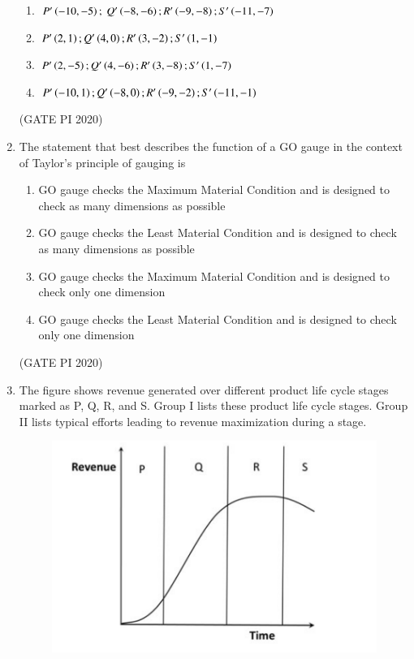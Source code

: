 \documentclass[journal,12pt,onecolumn]{IEEEtran}
\theoremstyle{remark}
\begin{document}
\begin{enumerate}
\begin{enumerate}
  \item $P'\left(-10,-5\right);\ Q'\left(-8,-6\right); R'\left(-9,-8\right); S'\left(-11,-7\right)$
    \item $P'\left(2,1\right); Q'\left(4,0\right); R'\left(3,-2\right); S'\left(1,-1\right)$
    \item $P'\left(2,-5\right); Q'\left(4,-6\right); R'\left(3,-8\right); S'\left(1,-7\right)$
    \item $P'\left(-10,1\right); Q'\left(-8,0\right); R'\left(-9,-2\right); S'\left(-11,-1\right)$
\end{enumerate}

\hfill (GATE PI 2020)

\item The statement that best describes the function of a GO gauge in the context of Taylor's principle of gauging is
\begin{enumerate}
    \item GO gauge checks the Maximum Material Condition and is designed to check as many dimensions as possible
    \item GO gauge checks the Least Material Condition and is designed to check as many dimensions as possible
    \item GO gauge checks the Maximum Material Condition and is designed to check only one dimension
    \item GO gauge checks the Least Material Condition and is designed to check only one dimension
\end{enumerate}

\hfill (GATE PI 2020)

\item The figure shows revenue generated over different product life cycle stages marked as P, Q, R, and S. Group I lists these product life cycle stages. Group II lists typical efforts leading to revenue maximization during a stage.

\begin{figure}[H]
    \centering
    \includegraphics[width=0.5\columnwidth]{figs/fig13.png}
    \caption{}
    \label{fig:placeholder}
\end{figure}


\end{enumerate}
\end{document}
